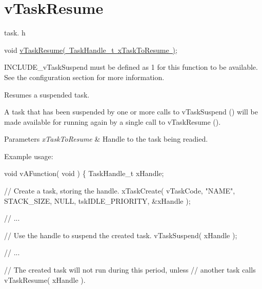 \hypertarget{group__v_task_resume}{}\section{v\+Task\+Resume}
\label{group__v_task_resume}
task. h 
\begin{DoxyPre}void \mbox{\hyperlink{task_8h_a84a1584f29fb7736a1aa72ad5b3e9b44}{vTaskResume( TaskHandle\_t xTaskToResume )}};\end{DoxyPre}


I\+N\+C\+L\+U\+D\+E\+\_\+v\+Task\+Suspend must be defined as 1 for this function to be available. See the configuration section for more information.

Resumes a suspended task.

A task that has been suspended by one or more calls to v\+Task\+Suspend () will be made available for running again by a single call to v\+Task\+Resume ().


\begin{DoxyParams}{Parameters}
{\em x\+Task\+To\+Resume} & Handle to the task being readied.\\
\hline
\end{DoxyParams}
Example usage\+: 
\begin{DoxyPre}
void vAFunction( void )
\{
TaskHandle\_t xHandle;\end{DoxyPre}



\begin{DoxyPre}    // Create a task, storing the handle.
    xTaskCreate( vTaskCode, "NAME", STACK\_SIZE, NULL, tskIDLE\_PRIORITY, \&xHandle );\end{DoxyPre}



\begin{DoxyPre}    // ...\end{DoxyPre}



\begin{DoxyPre}    // Use the handle to suspend the created task.
    vTaskSuspend( xHandle );\end{DoxyPre}



\begin{DoxyPre}    // ...\end{DoxyPre}



\begin{DoxyPre}    // The created task will not run during this period, unless
    // another task calls vTaskResume( xHandle ).\end{DoxyPre}



